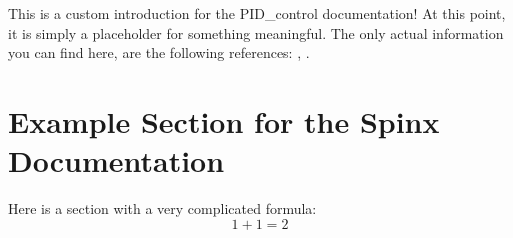This is a custom introduction for the PID\_control documentation! At this point, it is simply a placeholder for something meaningful. The only actual information you can find here, are the following references: \cite{Son1998}, \cite{Foell90}.

\section{Example Section for the Spinx Documentation}

Here is a section with a very complicated formula:
\begin{equation}
1 + 1 = 2
\end{equation}



